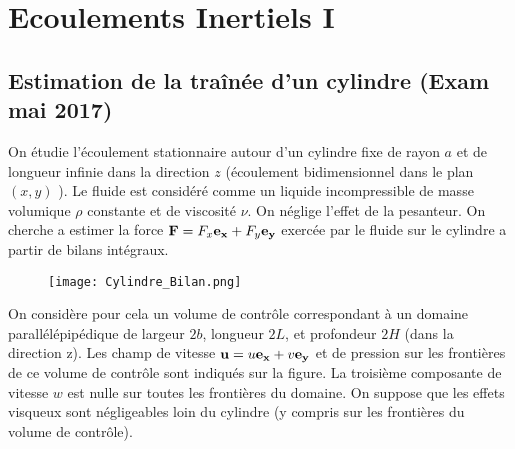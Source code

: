 
\setcounter{section}{6}



\section{Ecoulements Inertiels I }


\setcounter{subsection}{-1}



\subsection{Estimation de la traînée d'un cylindre (Exam mai 2017)}


On étudie l'écoulement stationnaire autour d'un cylindre fixe de rayon $a$ et de longueur infinie dans la direction $z$ (écoulement bidimensionnel dans le plan $(x,y)$ ). 
Le fluide est considéré comme un liquide incompressible de masse volumique $\rho$ constante et de viscosité $\nu$. On néglige l'effet de la pesanteur.
On cherche a estimer la force 
${\bf F} = F_x {\bf e_x} + F_y {\bf e_y} $ exercée par le fluide sur le cylindre a partir de bilans intégraux.



\begin{figure}[htb]
  \begin{center}
      \texttt{[image: Cylindre\_Bilan.png]}
      \end{center}
      \vspace{-1cm}
\end{figure}


 On considère pour cela un volume de contrôle correspondant à un domaine parallélépipédique 
 de largeur $2b$, longueur $2L$, et profondeur $2H$ (dans la direction z).  Les champ de vitesse ${\bf u} = u {\bf e_x} + v {\bf e_y} $  et de pression sur les frontières de ce volume de contrôle sont indiqués sur la figure. %
 La troisième composante de vitesse $w$ est nulle sur toutes les frontières du domaine.
 On suppose que les effets visqueux sont négligeables loin du cylindre (y compris sur les frontières du volume de contrôle).

